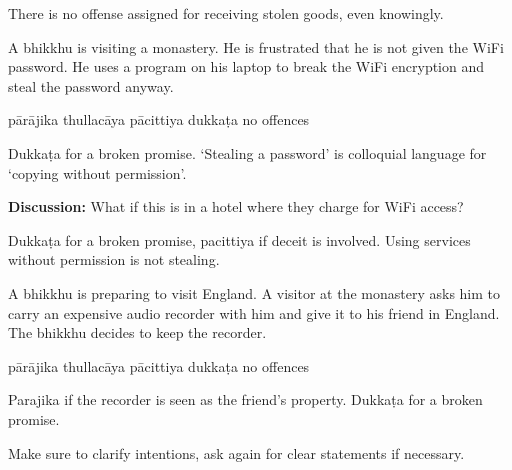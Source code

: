 \begin{exam}{\autoExamName}
\begin{problem*}
\begin{parts}
  \begin{solution}
    There is no offense assigned for receiving stolen goods, even knowingly.
  \end{solution}

  \bigskip

  \item A bhikkhu is visiting a monastery. He is frustrated that he is not given
    the WiFi password. He uses a program on his laptop to break the WiFi encryption
    and steal the password anyway.

  \bigskip

  \begin{answers}{5}
    \bChoices
     pārājika\eAns
     thullacāya\eAns
     pācittiya\eAns
     dukkaṭa\eAns
     no offences\eAns
    \eChoices
  \end{answers}

  \begin{solution}
    Dukkaṭa for a broken promise. `Stealing a password' is colloquial language
    for `copying without permission'.
  \end{solution}

  \bigskip

  \textbf{Discussion:} What if this is in a hotel where they charge for WiFi access?

  \begin{solution}
    Dukkaṭa for a broken promise, pacittiya if deceit is involved. Using services without permission is not stealing.
  \end{solution}

  \bigskip

  \item A bhikkhu is preparing to visit England. A visitor at the monastery asks
    him to carry an expensive audio recorder with him and give it to his friend in
    England. The bhikkhu decides to keep the recorder.

  \bigskip

  \begin{answers}{5}
    \bChoices
     pārājika\eAns
     thullacāya\eAns
     pācittiya\eAns
     dukkaṭa\eAns
     no offences\eAns
    \eChoices
  \end{answers}

  \begin{solution}
    Parajika if the recorder is seen as the friend's property.
    Dukkaṭa for a broken promise.

    Make sure to clarify intentions, ask again for
    clear statements if necessary.


\end{solution}
\end{parts}
\end{problem*}
\end{exam}
